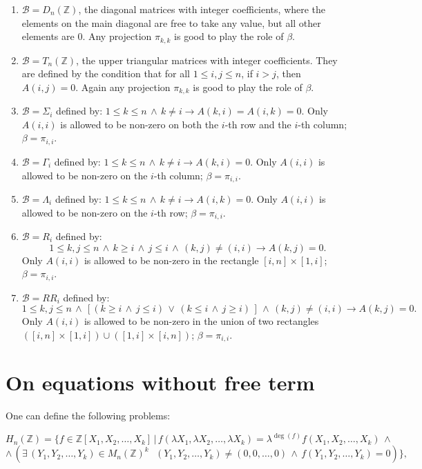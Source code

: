 \documentclass{article}
\theoremstyle{plain}
\theoremstyle{definition}
\begin{document}
\begin{enumerate}
\item $\mathcal B = D_n(\mathbb Z)$, the diagonal matrices with integer coefficients, where the elements on the main diagonal are free to take any value, but all other elements are $0$. Any projection $\pi_{k,k}$ is good to play the role of $\beta$.
\item $\mathcal B = T_n(\mathbb Z)$, the upper triangular matrices with integer coefficients. They are defined by the condition that for all $1 \leq i, j \leq n$, if $i > j$, then $A(i, j)=0$. Again any projection  $\pi_{k,k}$ is good to play the role of $\beta$. 
\item  $\mathcal B = \Sigma_i$ defined by: $1 \leq k \leq n \,\wedge \, k \neq i \rightarrow A(k,i) = A(i,k) = 0$. Only $A(i,i)$ is allowed to be non-zero on both the $i$-th row and the $i$-th column; $\beta = \pi_{i,i}$. 
\item  $\mathcal B = \Gamma_i$ defined by: $1 \leq k \leq n \,\wedge \, k \neq i \rightarrow A(k,i) = 0$. Only $A(i,i)$ is allowed to be non-zero on the $i$-th column; $\beta = \pi_{i,i}$. 
\item  $\mathcal B = \Lambda_i$ defined by: $1 \leq k \leq n \,\wedge \, k \neq i \rightarrow A(i,k) = 0$. Only $A(i,i)$ is allowed to be non-zero on the $i$-th row; $\beta = \pi_{i,i}$.
\item $\mathcal B = R_i$ defined by: $$1 \leq k,j \leq n\, \wedge \, k \geq i \, \wedge \, j \leq i \,\wedge \, (k,j) \neq (i,i) \rightarrow A(k,j) = 0.$$
Only $A(i,i)$ is allowed to be non-zero in the rectangle $[i,n] \times [1,i]$; $\beta = \pi_{i,i}$. 
\item $\mathcal B = RR_i$ defined by: 
 $$1 \leq k,j \leq n\, \wedge \, [ (k \geq i \, \wedge \, j \leq i) \, \vee  \,(k \leq i \, \wedge \, j \geq i)\,]\, \wedge \, (k,j) \neq (i,i) \rightarrow A(k,j) = 0.$$
Only $A(i,i)$ is allowed to be non-zero in the union of two rectangles $([i,n] \times [1,i]) \cup ([1,i] \times [i,n])$; $\beta = \pi_{i,i}$.
\end{enumerate}

\section{On equations without free term}\label{sect:nofreeterm}

One can define the following problems:

$$ H_n(\mathbb Z) = \{ f \in \mathbb Z[X_1, X_2, \dots, X_k]\,|\,f(\lambda X_1, \lambda X_2, \dots, \lambda X_k) = \lambda^{\deg(f)} f(X_1, X_2, \dots, X_k) \,\wedge  $$ $$ \wedge \, \left (\exists \,(Y_1, Y_2, \dots, Y_k) \in M_n(\mathbb Z)^k\,\,\,\,(Y_1, Y_2, \dots, Y_k) \neq (0, 0, \dots, 0) \,\wedge \, f(Y_1, Y_2, \dots, Y_k) = 0 \right )\}, $$ 
\end{document}
